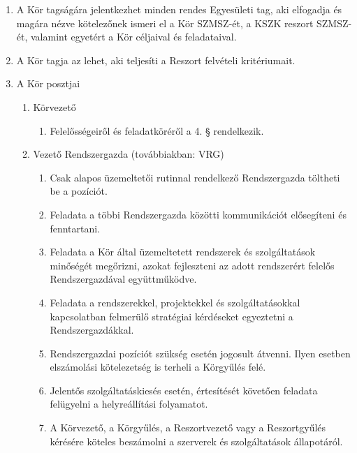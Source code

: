 \documentclass[12pt]{article}
\begin{document}
\begin{enumerate}
  \item A Kör tagságára jelentkezhet minden rendes Egyesületi tag, aki elfogadja és magára nézve kötelezőnek ismeri el a Kör SZMSZ-ét, a KSZK reszort SZMSZ-ét, valamint egyetért a Kör céljaival és feladataival.
  
  \item A Kör tagja az lehet, aki teljesíti a Reszort felvételi kritériumait.

  \item A Kör posztjai

\begin{enumerate} %
  \item Körvezető
    \begin{enumerate}
    \item Felelősségeiről és feladatköréről a 4. § rendelkezik.
    \end{enumerate}

  \item Vezető Rendszergazda (továbbiakban: VRG)
    \begin{enumerate}
        \item Csak alapos üzemeltetői rutinnal rendelkező Rendszergazda töltheti be a pozíciót.

        \item Feladata a többi Rendszergazda közötti kommunikációt elősegíteni és fenntartani.

        \item Feladata a Kör által üzemeltetett rendszerek és szolgáltatások minőségét megőrizni, azokat fejleszteni az adott rendszerért felelős Rendszergazdával együttműködve.

        \item Feladata a rendszerekkel, projektekkel és szolgáltatásokkal kapcsolatban felmerülő stratégiai kérdéseket egyeztetni a Rendszergazdákkal.

        \item Rendszergazdai pozíciót szükség esetén jogosult átvenni. Ilyen esetben elszámolási kötelezetség is terheli a Körgyűlés felé.

        \item Jelentős szolgáltatáskiesés esetén, értesítését követően feladata felügyelni a helyreállítási folyamatot.

        \item A Körvezető, a Körgyűlés, a Reszortvezető vagy a Reszortgyűlés kérésére köteles beszámolni a szerverek és szolgáltatások állapotáról.


\end{enumerate}
\end{enumerate}
\end{enumerate}
\end{document}
